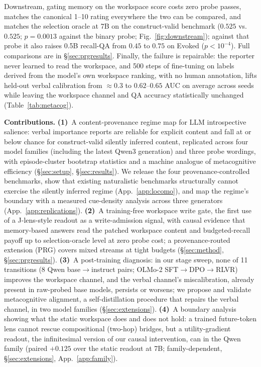 Downstream, gating memory on the workspace score costs zero probe passes,
matches the canonical 1--10 rating everywhere the two can be compared, and
matches the selection oracle at 7B on the construct-valid benchmark ($0.525$
vs.\ $0.525$; $p{=}0.0013$ against the binary probe;
Fig.~\ref{fig:downstream}); against that probe it also raises 0.5B recall-QA
from $0.45$ to $0.75$ on Evoked ($p{<}10^{-4}$). Full comparisons are in
\S\ref{sec:prgresults}.
Finally, the
failure is repairable: the reporter never learned to read the workspace, and 500
steps of fine-tuning on labels derived from the model's own workspace
ranking, with no human annotation, lifts held-out verbal calibration from
${\approx}0.3$ to $0.62$--$0.65$ AUC on average across seeds while leaving
the workspace channel and QA accuracy statistically unchanged
(Table~\ref{tab:metacog}).

\textbf{Contributions.}
\textbf{(1)}~A content-provenance regime map for LLM introspective salience:
verbal importance reports are reliable for explicit content and fall at or
below chance for construct-valid silently inferred content, replicated across
four model families (including the latest Qwen3 generation) and three probe wordings, with episode-cluster bootstrap
statistics and a machine analogue of metacognitive efficiency
(\S\ref{sec:setup}, \S\ref{sec:results}). We release the four
provenance-controlled benchmarks, show that existing naturalistic benchmarks
structurally cannot exercise the silently inferred regime
(App.~\ref{app:locomo}), and map the regime's boundary with a measured
cue-density analysis across three generators (App.~\ref{app:replications}).
\textbf{(2)}~A training-free workspace write gate, the first use of a
J-lens-style readout as a write-admission signal, with causal evidence that
memory-based answers read the patched workspace content and budgeted-recall
payoff up to selection-oracle level at zero probe cost; a provenance-routed
extension (PRG) covers mixed streams at tight budgets (\S\ref{sec:method},
\S\ref{sec:prgresults}).
\textbf{(3)}~A post-training diagnosis: in our stage sweep, none of 11 transitions
(8 Qwen base$\to$instruct pairs; OLMo-2 SFT$\to$DPO$\to$RLVR) improves the
workspace channel, and the verbal channel's miscalibration, already present in
raw-probed base models, persists or worsens; we propose and validate
metacognitive alignment, a self-distillation procedure that repairs the verbal
channel, in two model families (\S\ref{sec:extensions}).
\textbf{(4)}~A boundary analysis showing what the static workspace does and does
not hold: a trained future-token lens cannot rescue compositional (two-hop)
bridges, but a utility-gradient readout, the infinitesimal version of our
causal intervention, can in the Qwen family (paired $+0.125$ over the static
readout at 7B; family-dependent, \S\ref{sec:extensions},
App.~\ref{app:family}).


